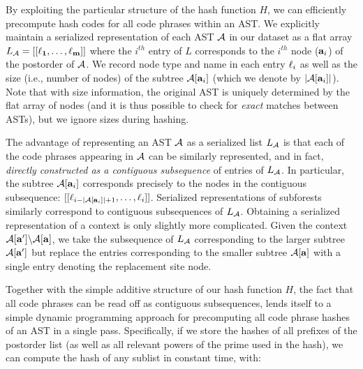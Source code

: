  By exploiting the particular structure of the hash function $H$, we can efficiently precompute
hash codes for all code phrases within an AST.
We explicitly maintain  a serialized representation of each AST $\mathcal{A}$ in our dataset
as a flat array $L_{\mathcal{A}}=[[{\bf\ell_1},\dots,{\bf\ell_m}]]$ 
where the $i^{th}$ entry of $L$ corresponds to the $i^{th}$ node (${\bf a}_{i}$) of the postorder of $\mathcal{A}$.
We record node type and name in each entry ${\bf \ell}_{i}$ as
well as the size (i.e., number of nodes) of the subtree $\mathcal{A}[{\bf a}_{i}]$ (which we denote by $|\mathcal{A}[{\bf a}_{i}]|$).
Note that with size information,  the original AST is uniquely determined by the flat array of nodes (and it is thus possible
to check for \emph{exact} matches between ASTs), but we ignore sizes during hashing.

The advantage of representing an AST $\mathcal{A}$ as a serialized list $L_{\mathcal{A}}$
is that each of the code phrases appearing in $\mathcal{A}$ can be similarly represented, and in fact, \emph{directly
constructed as a contiguous subsequence} of entries of $L_{\mathcal{A}}$.
In particular, the subtree $\mathcal{A}[{\bf a}_{i}]$ corresponds precisely to the nodes in 
the contiguous subsequence: $[[{\bf \ell}_{i - |\mathcal{A}[{\bf a}_{i}]| + 1},\dots,{\bf \ell}_{i}]]$.
Serialized representations of subforests similarly correspond to contiguous subsequences of $L_{\mathcal{A}}$.
Obtaining a serialized representation of a context is only slightly more complicated.  Given the context  $\mathcal{A}[{\bf a}']\backslash\mathcal{A}[{\bf a}]$,
we take the subsequence of $L_{\mathcal{A}}$ corresponding to the larger subtree $\mathcal{A}[{\bf a}']$ but replace the entries corresponding to the smaller subtree $\mathcal{A}[{\bf a}]$
with a single entry denoting the replacement site node.

Together with the simple additive structure of our hash function $H$, the fact that all code phrases can be read off as contiguous subsequences, 
lends itself to a simple dynamic programming approach for precomputing all code phrase hashes of an AST in a single pass.
Specifically, if we store the hashes of all prefixes of the postorder list (as well as all relevant powers 
of the prime used in the hash), we can compute the hash of any sublist in constant time, with:

